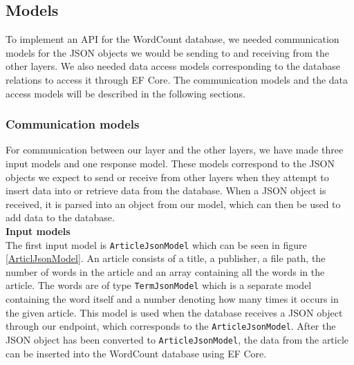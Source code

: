 \subsection{Models}
To implement an API for the WordCount database, we needed communication models for the JSON objects we would be sending to and receiving from the other layers. 
We also needed data access models corresponding to the database relations to access it through EF Core. 
The communication models and the data access models will be described in the following sections.

\subsubsection*{Communication models}
For communication between our layer and the other layers, we have made three input models and one response model. 
These models correspond to the JSON objects we expect to send or receive from other layers when they attempt to insert data into or retrieve data from the database. 
When a JSON object is received, it is parsed into an object from our model, which can then be used to add data to the database.
\\

\textbf{Input models}\\
The first input model is \texttt{ArticleJsonModel} which can be seen in figure \ref{ArticlJsonModel}. An article consists of a title, a publisher, a file path, the number of words in the article and an array containing all the words in the article. 
The words are of type \texttt{TermJsonModel} which is a separate model containing the word itself and a number denoting how many times it occurs in the given article.
This model is used when the database receives a JSON object through our endpoint, which corresponds to the \texttt{ArticleJsonModel}. 
After the JSON object has been converted to \texttt{ArticleJsonModel}, the data from the article can be inserted into the WordCount database using EF Core.

